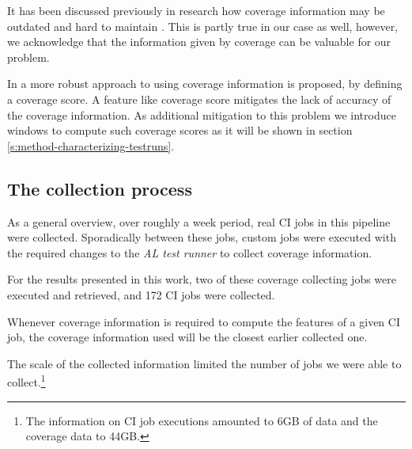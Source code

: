 It has been discussed previously in research how coverage information may be
outdated and hard to maintain \cite{Bertolino2020LearningtoRankVR}. This is 
partly true in our case as well, however, we acknowledge that the information 
given by coverage can be valuable for our problem.

In \cite{Busjaeger2016LearningFT} a more robust approach to using coverage information is proposed, by defining
a coverage score. A feature like coverage score mitigates the lack of accuracy 
of the coverage information. As additional mitigation to this problem we introduce
windows to compute such coverage scores as it will be shown in section \ref{s:method-characterizing-testruns}.

\subsection{The collection process}

As a general overview, over roughly a week period, real CI jobs in this pipeline were collected. 
Sporadically between these jobs, custom jobs were executed with the required changes
to the \emph{AL test runner} to collect coverage information. 

For the results presented in this work, two of these coverage collecting jobs were 
executed and retrieved, and 172 CI jobs were collected.

Whenever coverage information is required to compute the features of a given CI job,
the coverage information used will be the closest earlier collected one.

The scale of the collected information limited the number of jobs we were able to
collect.\footnote{The information on CI job executions amounted to 6GB of data and 
the coverage data to 44GB. }